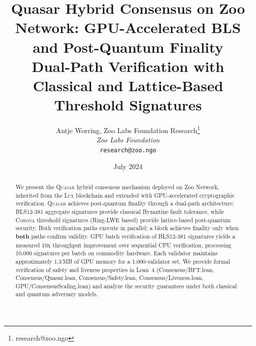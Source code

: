 \documentclass[11pt,letterpaper]{article}
\title{\textbf{Quasar Hybrid Consensus on Zoo Network: GPU-Accelerated BLS and Post-Quantum Finality}\\
\large Dual-Path Verification with Classical and Lattice-Based Threshold Signatures}
\author{
Antje Worring, Zoo Labs Foundation Research\thanks{research@zoo.ngo}\\
\textit{Zoo Labs Foundation}\\
\texttt{research@zoo.ngo}
}
\date{July 2024}
\theoremstyle{definition}
\theoremstyle{remark}
\newcommand{\Lux}{\textsc{Lux}}
\newcommand{\Quasar}{\textsc{Quasar}}
\newcommand{\Corona}{\textsc{Corona}}
\begin{document}
\zoocoverpage

\begin{abstract}
We present the \Quasar{} hybrid consensus mechanism deployed on Zoo Network, inherited from the \Lux{} blockchain and extended with GPU-accelerated cryptographic verification. \Quasar{} achieves post-quantum finality through a dual-path architecture: BLS12-381 aggregate signatures provide classical Byzantine fault tolerance, while \Corona{} threshold signatures (Ring-LWE based) provide lattice-based post-quantum security. Both verification paths execute in parallel; a block achieves finality only when \textbf{both} paths confirm validity. GPU batch verification of BLS12-381 signatures yields a measured 10x throughput improvement over sequential CPU verification, processing 10,000 signatures per batch on commodity hardware. Each validator maintains approximately 1.3\,MB of GPU memory for a 1,000-validator set. We provide formal verification of safety and liveness properties in Lean~4 (Consensus/BFT.lean, Consensus/Quasar.lean, Consensus/Safety.lean, Consensus/Liveness.lean, GPU/ConsensusScaling.lean) and analyze the security guarantees under both classical and quantum adversary models.
\end{abstract}

\tableofcontents
\newpage











\end{document}
